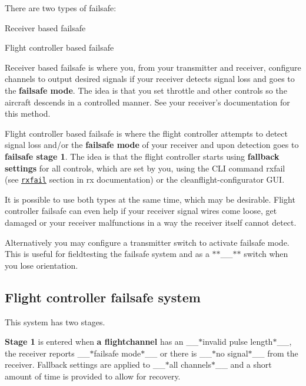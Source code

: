 There are two types of failsafe\+:


\begin{DoxyEnumerate}
\item Receiver based failsafe
\item Flight controller based failsafe
\end{DoxyEnumerate}

Receiver based failsafe is where you, from your transmitter and receiver, configure channels to output desired signals if your receiver detects signal loss and goes to the {\bfseries failsafe mode}. The idea is that you set throttle and other controls so the aircraft descends in a controlled manner. See your receiver's documentation for this method.

Flight controller based failsafe is where the flight controller attempts to detect signal loss and/or the {\bfseries failsafe mode} of your receiver and upon detection goes to {\bfseries failsafe stage 1}. The idea is that the flight controller starts using {\bfseries fallback settings} for all controls, which are set by you, using the C\+L\+I command {\ttfamily rxfail} (see \href{Rx.md#rx-loss-configuration}{\tt rxfail} section in rx documentation) or the cleanflight-\/configurator G\+U\+I.

It is possible to use both types at the same time, which may be desirable. Flight controller failsafe can even help if your receiver signal wires come loose, get damaged or your receiver malfunctions in a way the receiver itself cannot detect.

Alternatively you may configure a transmitter switch to activate failsafe mode. This is useful for fieldtesting the failsafe system and as a $\ast$$\ast$\+\_\+\_\+$\ast$$\ast$ switch when you lose orientation.

\subsection*{Flight controller failsafe system}

This system has two stages.

{\bfseries Stage 1} is entered when {\bfseries a flightchannel} has an \+\_\+\+\_\+$\ast$invalid pulse length$\ast$\+\_\+\+\_\+, the receiver reports \+\_\+\+\_\+$\ast$failsafe mode$\ast$\+\_\+\+\_\+ or there is \+\_\+\+\_\+$\ast$no signal$\ast$\+\_\+\+\_\+ from the receiver. Fallback settings are applied to \+\_\+\+\_\+$\ast$all channels$\ast$\+\_\+\+\_\+ and a short amount of time is provided to allow for recovery.

